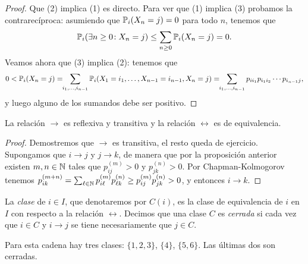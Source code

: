 \begin{proof}

Que (2) implica (1) es directo.
Para ver que (1) implica (3) probamos la contrarecíproca: asumiendo que $\mathbb{P}_i(X_n=j)=0$ para todo $n$, tenemos que 
\[\mathbb{P}_i(\exists n\geq0\!:X_n=j)\leq\sum_{n\geq0}\mathbb{P}_i(X_n=j)=0.\]
Veamos ahora que (3) implica (2): tenemos que
\[0<\mathbb{P}_i(X_n=j)=\!\!\sum_{i_1,\dotsc,i_{n-1}}\mathbb{P}_i(X_1=i_1,\dotsc,X_{n-1}=i_{n-1},X_n=j)=\!\!\sum_{i_1,\dotsc,i_{n-1}}p_{ii_1}p_{i_1i_2}\dotsm p_{i_{n-1}j},\]
y luego alguno de los sumandos debe ser positivo.
\end{proof}

\begin{prop}
La relación $\to$ es reflexiva y transitiva y la relación $\leftrightarrow$ es de equivalencia.
\end{prop}

\begin{proof}
Demostremos que $\to$ es transitiva, el resto queda de ejercicio.
Supongamos que $i\to j$ y $j\to k$, de manera que por la proposición anterior existen $m,n\in\mathbb{N}$ tales que $p^{(m)}_{ij}>0$ y $p^{(n)}_{jk}>0$.
Por Chapman-Kolmogorov tenemos $p^{(m+n)}_{ik}=\sum_{\ell\in\mathbb{N}}p^{(m)}_{i\ell}p^{(n)}_{\ell k}\geq p^{(m)}_{ij}p^{(n)}_{jk}>0$, y entonces $i\to k$.
\end{proof}

\begin{defn}
La \emph{clase} de $i\in I$, que denotaremos por $C(i)$, es la clase de equivalencia de $i$ en $I$ con respecto a la relación $\leftrightarrow$.
Decimos que una clase $C$ es \emph{cerrada} si cada vez que $i\in C$ y $i\to j$ se tiene necesariamente que $j\in C$.
\end{defn}

\begin{ex}
\leavevmode
\begin{center}
\end{center}
Para esta cadena hay tres clases: $\{1,2,3\}$, $\{4\}$, $\{5,6\}$.
Las últimas dos son cerradas.
\end{ex}

